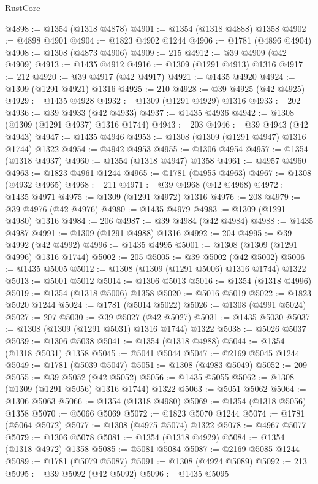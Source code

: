 \begin{lexlean}{RustCore}
\begin{coremodule}
@4898 := @1354 (@1318 @4878)
@4901 := @1354 (@1318 @4888) @1358
@4902 := @4898 @4901
@4904 := @1823 @4902 @1244
@4906 := @1781 (@4896 @4904)
@4908 := @1308 (@4873 @4906)
@4909 := 215
@4912 := @39 @4909 (@42 @4909)
@4913 := @1435 @4912
@4916 := @1309 (@1291 @4913) @1316
@4917 := 212
@4920 := @39 @4917 (@42 @4917)
@4921 := @1435 @4920
@4924 := @1309 (@1291 @4921) @1316
@4925 := 210
@4928 := @39 @4925 (@42 @4925)
@4929 := @1435 @4928
@4932 := @1309 (@1291 @4929) @1316
@4933 := 202
@4936 := @39 @4933 (@42 @4933)
@4937 := @1435 @4936
@4942 := @1308 (@1309 (@1291 @4937) @1316 @1744)
@4943 := 203
@4946 := @39 @4943 (@42 @4943)
@4947 := @1435 @4946
@4953 := @1308 (@1309 (@1291 @4947) @1316 @1744) @1322
@4954 := @4942 @4953
@4955 := @1306 @4954
@4957 := @1354 (@1318 @4937)
@4960 := @1354 (@1318 @4947) @1358
@4961 := @4957 @4960
@4963 := @1823 @4961 @1244
@4965 := @1781 (@4955 @4963)
@4967 := @1308 (@4932 @4965)
@4968 := 211
@4971 := @39 @4968 (@42 @4968)
@4972 := @1435 @4971
@4975 := @1309 (@1291 @4972) @1316
@4976 := 208
@4979 := @39 @4976 (@42 @4976)
@4980 := @1435 @4979
@4983 := @1309 (@1291 @4980) @1316
@4984 := 206
@4987 := @39 @4984 (@42 @4984)
@4988 := @1435 @4987
@4991 := @1309 (@1291 @4988) @1316
@4992 := 204
@4995 := @39 @4992 (@42 @4992)
@4996 := @1435 @4995
@5001 := @1308 (@1309 (@1291 @4996) @1316 @1744)
@5002 := 205
@5005 := @39 @5002 (@42 @5002)
@5006 := @1435 @5005
@5012 := @1308 (@1309 (@1291 @5006) @1316 @1744) @1322
@5013 := @5001 @5012
@5014 := @1306 @5013
@5016 := @1354 (@1318 @4996)
@5019 := @1354 (@1318 @5006) @1358
@5020 := @5016 @5019
@5022 := @1823 @5020 @1244
@5024 := @1781 (@5014 @5022)
@5026 := @1308 (@4991 @5024)
@5027 := 207
@5030 := @39 @5027 (@42 @5027)
@5031 := @1435 @5030
@5037 := @1308 (@1309 (@1291 @5031) @1316 @1744) @1322
@5038 := @5026 @5037
@5039 := @1306 @5038
@5041 := @1354 (@1318 @4988)
@5044 := @1354 (@1318 @5031) @1358
@5045 := @5041 @5044
@5047 := @2169 @5045 @1244
@5049 := @1781 (@5039 @5047)
@5051 := @1308 (@4983 @5049)
@5052 := 209
@5055 := @39 @5052 (@42 @5052)
@5056 := @1435 @5055
@5062 := @1308 (@1309 (@1291 @5056) @1316 @1744) @1322
@5063 := @5051 @5062
@5064 := @1306 @5063
@5066 := @1354 (@1318 @4980)
@5069 := @1354 (@1318 @5056) @1358
@5070 := @5066 @5069
@5072 := @1823 @5070 @1244
@5074 := @1781 (@5064 @5072)
@5077 := @1308 (@4975 @5074) @1322
@5078 := @4967 @5077
@5079 := @1306 @5078
@5081 := @1354 (@1318 @4929)
@5084 := @1354 (@1318 @4972) @1358
@5085 := @5081 @5084
@5087 := @2169 @5085 @1244
@5089 := @1781 (@5079 @5087)
@5091 := @1308 (@4924 @5089)
@5092 := 213
@5095 := @39 @5092 (@42 @5092)
@5096 := @1435 @5095

\end{coremodule}
\end{lexlean}
